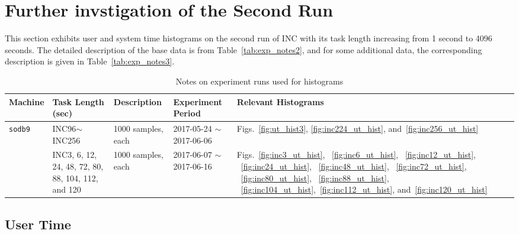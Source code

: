 \section{Further invstigation of the Second Run~\label{sec:u_s_time_hist}} 
This section exhibits user and system time histograms on the second run of 
INC with its task length increasing from 1 second to 4096 seconds. 
The detailed description of the base data is from Table~\ref{tab:exp_notes2}, 
and for some additional data, the corresponding description is given in Table~\ref{tab:exp_notes3}.

\begin{table}[h]
\begin{center}
\begin{tabular}{|p{2cm}|p{3cm}|p{3cm}|p{4cm}|p{3.5cm}|} \hline
Machine & Task Length (sec) & Description & Experiment Period & Relevant \linebreak Histograms\\ \hline
{\tt sodb9} &  INC96$\sim$INC256 & 1000 samples, each & 2017-05-24 $\sim$ 2017-06-06 & 
Figs.~\ref{fig:ut_hist3}, \ref{fig:inc224_ut_hist}, and~\ref{fig:inc256_ut_hist}\\ \hline
					&  INC3, 6, 12, 24, 48, 72, 80, 88, 104, 112, and 120 & 1000 samples, each & 2017-06-07 $\sim$ 2017-06-16 & Figs.~\ref{fig:inc3_ut_hist}, ~\ref{fig:inc6_ut_hist}, ~\ref{fig:inc12_ut_hist}, ~\ref{fig:inc24_ut_hist},
~\ref{fig:inc48_ut_hist}, ~\ref{fig:inc72_ut_hist}, ~\ref{fig:inc80_ut_hist}, ~\ref{fig:inc88_ut_hist}, ~\ref{fig:inc104_ut_hist},~\ref{fig:inc112_ut_hist}, and~\ref{fig:inc120_ut_hist}\\ \hline
\end{tabular}
\end{center}
\vspace{-.2in}
\caption{Notes on experiment runs used for histograms\label{tab:exp_notes4}}
\end{table}

\newpage
\subsection{User Time}

